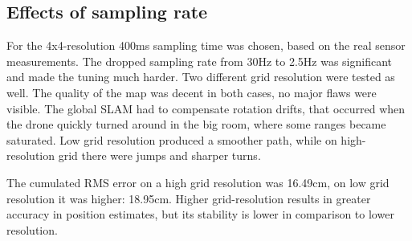\documentclass[conference]{IEEEtran}
\begin{document}







\subsection{Effects of sampling rate}

For the 4x4-resolution 400ms sampling time was chosen, based on the real sensor measurements. The dropped 
sampling rate 
from 30Hz to 2.5Hz was significant and made the tuning much harder. Two different grid resolution were tested 
as well. The quality of the map was decent in both cases, no major flaws were visible. The global SLAM had to 
compensate rotation drifts, that occurred when the drone quickly turned around in the big room, where some 
ranges became saturated. Low grid resolution produced a smoother path, while on high-resolution grid there 
were jumps and sharper turns. 

The cumulated RMS error on a high grid resolution was 16.49cm, on low grid resolution it was higher: 18.95cm. 
Higher grid-resolution results in greater accuracy in position estimates, but its stability is lower in comparison
to lower resolution. 
\end{document}
